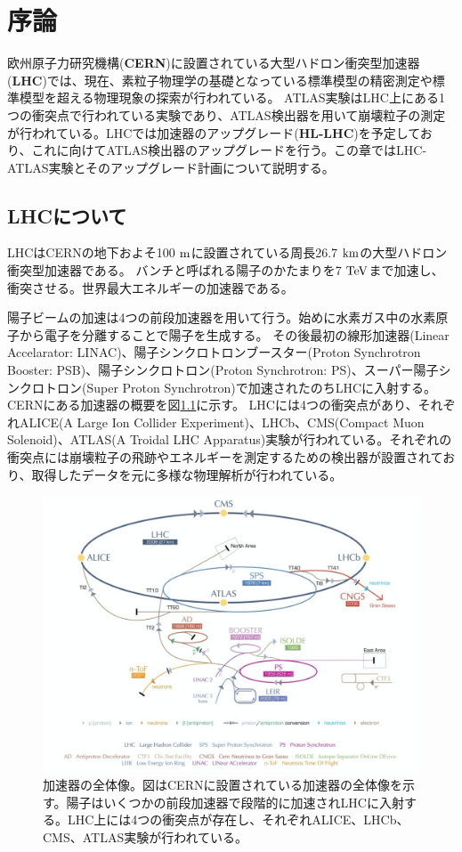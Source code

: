 \chapter{序論}
欧州原子力研究機構(\textbf{CERN})に設置されている大型ハドロン衝突型加速器(\textbf{LHC})では、現在、素粒子物理学の基礎となっている標準模型の精密測定や標準模型を超える物理現象の探索が行われている。
ATLAS実験はLHC上にある1つの衝突点で行われている実験であり、ATLAS検出器を用いて崩壊粒子の測定が行われている。LHCでは加速器のアップグレード(\textbf{HL-LHC})を予定しており、これに向けてATLAS検出器のアップグレードを行う。この章ではLHC-ATLAS実験とそのアップグレード計画について説明する。

\section{LHCについて}
LHCはCERNの地下およそ100 $\rm{m}$に設置されている周長26.7 $\rm{km}$の大型ハドロン衝突型加速器である。
バンチと呼ばれる陽子のかたまりを7 $\rm{TeV}$まで加速し、衝突させる。世界最大エネルギーの加速器である。

陽子ビームの加速は4つの前段加速器を用いて行う。始めに水素ガス中の水素原子から電子を分離することで陽子を生成する。
その後最初の線形加速器(Linear Accelarator: LINAC)、陽子シンクロトロンブースター(Proton Synchrotron Booster: PSB)、陽子シンクロトロン(Proton Synchrotron: PS)、スーパー陽子シンクロトロン(Super Proton Synchrotron)で加速されたのちLHCに入射する。CERNにある加速器の概要を図\ref{LHC_overview}に示す。
LHCには4つの衝突点があり、それぞれALICE(A Large Ion Collider Experiment)、LHCb、CMS(Compact Muon Solenoid)、ATLAS(A
Troidal LHC Apparatus)実験が行われている。それぞれの衝突点には崩壊粒子の飛跡やエネルギーを測定するための検出器が設置されており、取得したデータを元に多様な物理解析が行われている。

\begin{figure}[bpt]\centering
\includegraphics[width=12cm]{LHC_overview}
\caption[加速器の全体像]{加速器の全体像\cite{1-1}。図はCERNに設置されている加速器の全体像を示す。陽子はいくつかの前段加速器で段階的に加速されLHCに入射する。LHC上には4つの衝突点が存在し、それぞれALICE、LHCb、CMS、ATLAS実験が行われている。}
\label{LHC_overview}
\end{figure}

